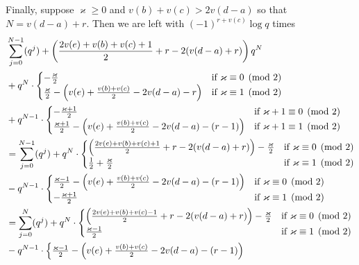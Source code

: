 \begin{itemize}
\ii Finally, suppose $\varkappa \ge 0$ and $v(b) + v(c) > 2v(d-a)$
so that $N = v(d-a) + r$.
Then we are left with $(-1)^{r+v(c)} \log q$ times
\begin{align*}
  & \sum_{j=0}^{N-1} (q^j) + \left( \frac{2v(e)+v(b)+v(c)+1}{2} + r - 2(v(d-a)+r) \right) q^N \\
  & + q^{N} \cdot
  \begin{cases}
    -\frac{\varkappa}{2} & \text{if }\varkappa \equiv 0 \pmod 2 \\
    \frac{\varkappa}{2} - \left( v(e)+\frac{v(b)+v(c)}{2}-2v(d-a)-r \right)
    & \text{if }\varkappa \equiv 1 \pmod 2 \\
  \end{cases} \\
  & + q^{N-1} \cdot
  \begin{cases}
    -\frac{\varkappa+1}{2} & \text{if }\varkappa+1 \equiv 0 \pmod 2 \\
    \frac{\varkappa+1}{2} - \left( v(e)+\frac{v(b)+v(c)}{2}-2v(d-a)-(r-1) \right)
    & \text{if }\varkappa+1 \equiv 1 \pmod 2
  \end{cases} \\
  &= \sum_{j=0}^{N-1} (q^j)
   + q^{N} \cdot
  \begin{cases}
    \left( \frac{2v(e)+v(b)+v(c)+1}{2} + r - 2(v(d-a)+r) \right) -\frac{\varkappa}{2} & \text{if }\varkappa \equiv 0 \pmod 2 \\
    \frac{1}{2} + \frac{\varkappa}{2} & \text{if }\varkappa \equiv 1 \pmod 2
  \end{cases} \\
  & - q^{N-1} \cdot
  \begin{cases}
    \frac{\varkappa-1}{2} - \left( v(e)+\frac{v(b)+v(c)}{2}-2v(d-a)-(r-1) \right)
    & \text{if }\varkappa \equiv 0 \pmod 2 \\
    -\frac{\varkappa+1}{2} & \text{if }\varkappa \equiv 1 \pmod 2
  \end{cases} \\
  &= \sum_{j=0}^{N} (q^j)
   + q^{N} \cdot
  \begin{cases}
    \left( \frac{2v(e)+v(b)+v(c)-1}{2} + r - 2(v(d-a)+r) \right) -\frac{\varkappa}{2} & \text{if }\varkappa \equiv 0 \pmod 2 \\
    \frac{\varkappa-1}{2} & \text{if }\varkappa \equiv 1 \pmod 2
  \end{cases} \\
  & - q^{N-1} \cdot
  \begin{cases}
    \frac{\varkappa-1}{2} - \left( v(e)+\frac{v(b)+v(c)}{2}-2v(d-a)-(r-1) \right)

\end{cases}
\end{align*}
\end{itemize}
